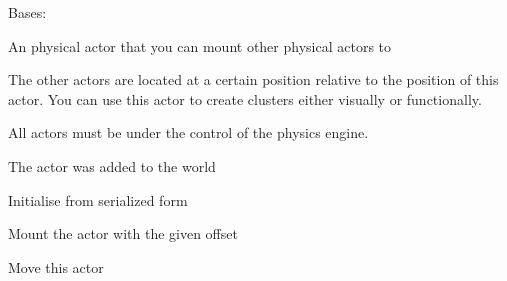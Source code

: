 \documentclass[letterpaper,10pt,english]{sphinxmanual}
\begin{document}
\begin{fulllineitems}
\label{actor:serge.actor.PhysicallyMountableActor}
Bases: 

An physical actor that you can mount other physical actors to

The other actors are located at a certain position
relative to the position of this actor. You can
use this actor to create clusters either visually
or functionally.

All actors must be under the control of the physics engine.

\begin{fulllineitems}
\label{actor:serge.actor.PhysicallyMountableActor.addedToWorld}
The actor was added to the world

\end{fulllineitems}


\begin{fulllineitems}
\label{actor:serge.actor.PhysicallyMountableActor.init}
Initialise from serialized form

\end{fulllineitems}


\begin{fulllineitems}
\label{actor:serge.actor.PhysicallyMountableActor.mountActor}
Mount the actor with the given offset

\end{fulllineitems}


\begin{fulllineitems}
\label{actor:serge.actor.PhysicallyMountableActor.moveTo}
Move this actor


\end{fulllineitems}
\end{fulllineitems}
\end{document}
